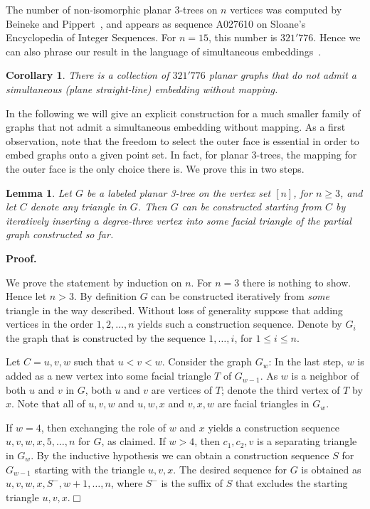 \documentclass[11pt]{article}
\newtheorem{lemma}[equation]{Lemma}
\newtheorem{corollary}[equation]{Corollary}
\newcommand{\qed}{\hfill\ensuremath{\Box}}
\newenvironment{proof}{\noindent\textbf{Proof.}
}{\par\medskip}
\begin{document}
The number of non-isomorphic planar 3-trees on $n$ vertices was computed by
Beineke and Pippert~\cite{BP74}, and appears as sequence A027610 on Sloane's
Encyclopedia of Integer Sequences. For $n=15$, this number is $321'776$.  Hence
we can also phrase our result in the language of simultaneous
embeddings~\cite{bcdeeiklm-spge-07}.
\begin{corollary}
  There is a collection of $321'776$ planar graphs that do not admit a
  simultaneous (plane straight-line) embedding without mapping.
\end{corollary}
In the following we will give an explicit construction for a much smaller family
of graphs that not admit a simultaneous embedding without mapping. As a first
observation, note that the freedom to select the outer face is essential in
order to embed graphs onto a given point set. In fact, for planar 3-trees, the
mapping for the outer face is the only choice there is. We prove this in two
steps.
\begin{lemma}
  \label{lem:stacked_any_face}
  Let $G$ be a labeled planar 3-tree on the vertex set $[n]$, for $n\ge 3$, and
  let $C$ denote any triangle in $G$. Then $G$ can be constructed starting from
  $C$ by iteratively inserting a degree-three vertex into some facial triangle
  of the partial graph constructed so far.
\end{lemma}
\begin{proof}
  We prove the statement by induction on $n$. For $n=3$ there is nothing to
  show. Hence let $n>3$. By definition $G$ can be constructed iteratively from
  \emph{some} triangle in the way described. Without loss of generality suppose
  that adding vertices in the order $1,2,\ldots,n$ yields such a construction
  sequence. Denote by $G_i$ the graph that is constructed by the sequence
  $1,\ldots,i$, for $1\le i\le n$.

  Let $C=u,v,w$ such that $u<v<w$. Consider the graph $G_w$: In the last step,
  $w$ is added as a new vertex into some facial triangle $T$ of $G_{w-1}$. As
  $w$ is a neighbor of both $u$ and $v$ in $G$, both $u$ and $v$ are vertices of
  $T$; denote the third vertex of $T$ by $x$. Note that all of $u,v,w$ and
  $u,w,x$ and $v,x,w$ are facial triangles in $G_w$.

  If $w=4$, then exchanging the role of $w$ and $x$ yields a construction
  sequence $u,v,w,x,5,\ldots,n$ for $G$, as claimed. If $w>4$, then $c_1,c_2,v$
  is a separating triangle in $G_w$. By the inductive hypothesis we can obtain a
  construction sequence $S$ for $G_{w-1}$ starting with the triangle
  $u,v,x$. The desired sequence for $G$ is obtained as
  $u,v,w,x,S^-,w+1,\ldots,n$, where $S^-$ is the suffix of $S$ that excludes the
  starting triangle $u,v,x$.\qed
\end{proof}
\end{document}
